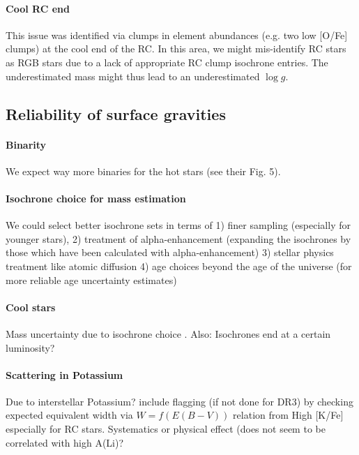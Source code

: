 \documentclass[fleqn,usenatbib,useAMS]{mnras}
\begin{document}
\paragraph*{Cool RC end} This issue was identified via clumps in element abundances (e.g. two low [O/Fe] clumps) at the cool end of the RC. In this area, we might mis-identify RC stars as RGB stars due to a lack of appropriate RC clump isochrone entries. The underestimated mass might thus lead to an underestimated $\log g$.

\subsection{Reliability of surface gravities}

\paragraph*{Binarity}

\citet{PriceWhelan2020} We expect way more binaries for the hot stars (see their Fig. 5).

\paragraph*{Isochrone choice for mass estimation} We could select better isochrone sets in terms of 1) finer sampling (especially for younger stars), 2) treatment of alpha-enhancement (expanding the isochrones by those which have been calculated with alpha-enhancement) 3) stellar physics treatment like atomic diffusion 4) age choices beyond the age of the universe (for more reliable age uncertainty estimates)

\paragraph*{Cool stars}
Mass uncertainty due to isochrone choice \citep[see discussion e.g. in ][]{Heiter2015}. Also: Isochrones end at a certain luminosity?

\paragraph*{Scattering in Potassium} Due to interstellar Potassium? include flagging (if not done for DR3) by checking expected equivalent width via $W = f(E(B-V))$ relation from \citet{Munari1997} High [K/Fe] especially for RC stars. Systematics or physical effect (does not seem to be correlated with high A(Li)?
\end{document}
